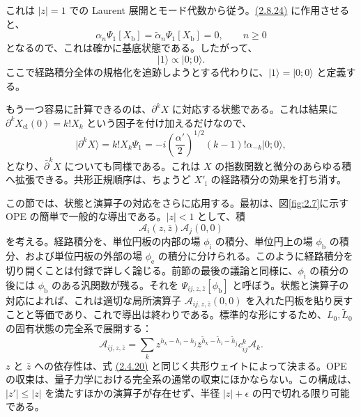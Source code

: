 これは $|z|=1$ での Laurent 展開とモード代数から従う。\hyperref[eq:2.8.24]{(2.8.24)} に作用させると、
\begin{equation}
\alpha_n\Psi_1[X_{\mathrm b}]
=\widetilde\alpha_n\Psi_1[X_{\mathrm b}]=0,\qquad n\geq0
\tag{2.8.26}\label{eq:2.8.26}
\end{equation}
となるので、これは確かに基底状態である。したがって、
\begin{equation}
\lvert1\rangle\propto\lvert0;0\rangle.
\tag{2.8.27}\label{eq:2.8.27}
\end{equation}
ここで経路積分全体の規格化を追跡しようとする代わりに、$\lvert1\rangle=\lvert0;0\rangle$ と定義する。

もう一つ容易に計算できるのは、$\partial^kX$ に対応する状態である。これは結果に $\partial^kX_{\mathrm{cl}}(0)=k!X_k$ という因子を付け加えるだけなので、
\begin{equation}
\lvert\partial^kX\rangle=k!X_k\Psi_1
=-i\left(\frac{\alpha'}2\right)^{1/2}
(k-1)!\alpha_{-k}\lvert0;0\rangle,
\tag{2.8.28}\label{eq:2.8.28}
\end{equation}
となり、$\bar\partial^kX$ についても同様である。これは $X$ の指数関数と微分のあらゆる積へ拡張できる。共形正規順序は、ちょうど $X'_{\mathrm i}$ の経路積分の効果を打ち消す。

\label{sec:2.9}

この節では、状態と演算子の対応をさらに応用する。最初は、図\ref{fig:2.7}に示す OPE の簡単で一般的な導出である。$|z|<1$ として、積
\begin{equation}
\mathcal A_i(z,\bar z)\mathcal A_j(0,0)
\tag{2.9.1}\label{eq:2.9.1}
\end{equation}
を考える。経路積分を、単位円板の内部の場 $\phi_{\mathrm i}$ の積分、単位円上の場 $\phi_{\mathrm b}$ の積分、および単位円板の外部の場 $\phi_{\mathrm e}$ の積分に分けられる。このように経路積分を切り開くことは付録で詳しく論じる。前節の最後の議論と同様に、$\phi_{\mathrm i}$ の積分の後には $\phi_{\mathrm b}$ のある汎関数が残る。それを $\Psi_{ij,z,\bar z}[\phi_{\mathrm b}]$ と呼ぼう。状態と演算子の対応によれば、これは適切な局所演算子 $\mathcal A_{ij,z,\bar z}(0,0)$ を入れた円板を貼り戻すことと等価であり、これで導出は終わりである。標準的な形にするため、$L_0,\widetilde L_0$ の固有状態の完全系で展開する：
\begin{equation}
\mathcal A_{ij,z,\bar z}
=\sum_k z^{h_k-h_i-h_j}
\bar z^{\widetilde h_k-\widetilde h_i-\widetilde h_j}
c^k_{ij}\mathcal A_k.
\tag{2.9.2}\label{eq:2.9.2}
\end{equation}
$z$ と $\bar z$ への依存性は、式 \hyperref[eq:2.4.20]{(2.4.20)} と同じく共形ウェイトによって決まる。OPE の収束は、量子力学における完全系の通常の収束にほかならない。この構成は、$|z'|\leq|z|$ を満たすほかの演算子が存在せず、半径 $|z|+\epsilon$ の円で切れる限り可能である。

